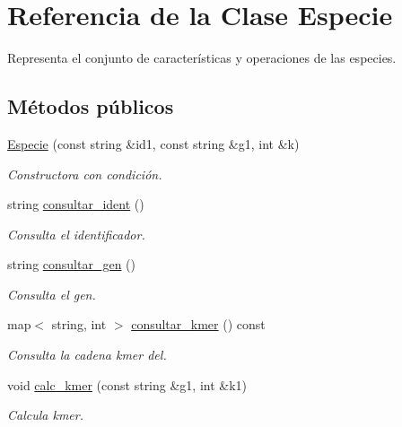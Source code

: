 \hypertarget{class_especie}{}\section{Referencia de la Clase Especie}
\label{class_especie}


Representa el conjunto de características y operaciones de las especies.  


\subsection*{Métodos públicos}
\begin{DoxyCompactItemize}
\item 
\hyperlink{class_especie_aa7219bcb41854d0f02b486fbfc0ce9a2}{Especie} (const string \&id1, const string \&g1, int \&k)
\begin{DoxyCompactList}\small\item\em Constructora con condición. \end{DoxyCompactList}\item 
string \hyperlink{class_especie_a2c3f4a6aa3337ce1fa7e8c7d5be73c50}{consultar\+\_\+ident} ()
\begin{DoxyCompactList}\small\item\em Consulta el identificador. \end{DoxyCompactList}\item 
string \hyperlink{class_especie_a352a338730450aa182e747ed88280e55}{consultar\+\_\+gen} ()
\begin{DoxyCompactList}\small\item\em Consulta el gen. \end{DoxyCompactList}\item 
map$<$ string, int $>$ \hyperlink{class_especie_a83ba0eee5730ca54986b741e982f1a07}{consultar\+\_\+kmer} () const
\begin{DoxyCompactList}\small\item\em Consulta la cadena {\itshape kmer} del. \end{DoxyCompactList}\item 
void \hyperlink{class_especie_afbfd4e6e131adf6a2a83e7c495a93a2a}{calc\+\_\+kmer} (const string \&g1, int \&k1)
\begin{DoxyCompactList}\small\item\em Calcula kmer. \end{DoxyCompactList}\end{DoxyCompactItemize}

